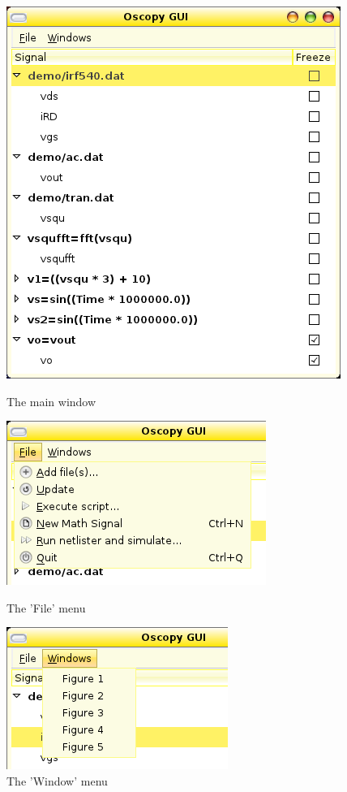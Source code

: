 \documentclass[a4paper,11pt]{article}
\begin{document}
\begin{figure}[htbp]
  \centering
  \includegraphics[scale=.5]{../png/ioscopy-gui.png}
  \caption{The main window}
  \label{fig:mainwin}
  \begin{minipage}{.45\linewidth}
    \includegraphics[scale=.5]{../png/ioscopy-file.png}
    \caption{The 'File' menu}
    \label{fig:filemenu}
  \end{minipage}
  \begin{minipage}{.45\linewidth}
    \includegraphics[scale=.5]{../png/ioscopy-window.png}
    \caption{The 'Window' menu}
    \label{fig:windowmenu}    
  \end{minipage}


\end{figure}
\end{document}
